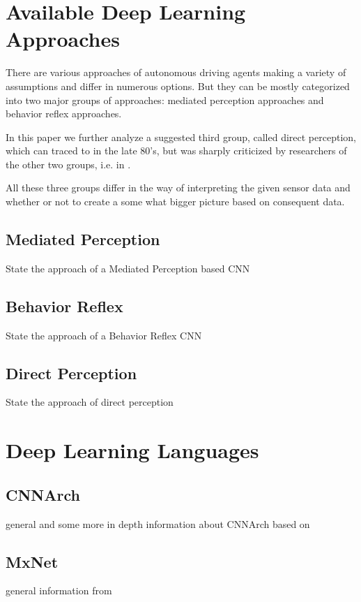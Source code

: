 \section{Available Deep Learning Approaches}\label{sec: Deep Learning Approaches}

There are various approaches of autonomous driving agents making a variety of assumptions and differ in numerous options. But they can be mostly categorized into two major groups of approaches: mediated perception approaches and behavior reflex approaches. \cite{chen2015deepdriving}

In this paper we further analyze a suggested third group, called direct perception, which can traced to \cite{gibson2014ecological} in the late 80's, but was sharply criticized by researchers of the other two groups, i.e. in \cite{ullman1980against}.

All these three groups differ in the way of interpreting the given sensor data and whether or not to create a some what bigger picture based on consequent data.

\subsection{Mediated Perception} \label{subsec: Mediated Perception}

State the approach of a Mediated Perception based CNN

\subsection{Behavior Reflex}\label{subsec: Behavior Reflex}

State the approach of a Behavior Reflex CNN

\subsection{Direct Perception}\label{subsec: Direct Perception}

State the approach of direct perception 

\section{Deep Learning Languages}\label{sec: DLL}

\subsection{CNNArch}\label{subsec: CNNArch}

general and some more in depth information about CNNArch based on \cite{CNNArch}

\subsection{MxNet}\label{subsec: MxNet}

general information from \cite{chen2015mxnet}

